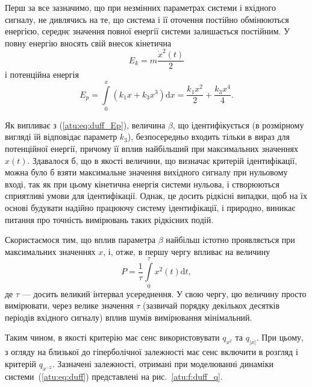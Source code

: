 Перш за все зазначимо, що при незмінних параметрах системи і
вхідного сигналу, не дивлячись на те, що система і її оточення
постійно обмінюються енергією, середнє значення повної енергії
системи залишається постійним. У повну енергію вносять свій
внесок кінетична
%
\begin{equation}
E_k = m \frac{\dot{x}^2(t)}{2}
\label{atu:eq:duff_Ek}
\end{equation}
%
і потенційна енергія
%
\begin{equation}
  E_p = \int\limits_0^x ( k_1 x + k_3 x^3 ) \mathrm{d}x =
\frac{k_1 x^2}{2} + \frac{k_3 x^4}{4}.
\label{atu:eq:duff_Ep}
\end{equation}

Як випливає з (\ref{atu:eq:duff_Ep}), величина $\beta$, що ідентифікується
(в розмірному вигляді їй відповідає параметр $k_3$), безпосередньо
входить тільки в вираз для потенційної енергії, причому її
вплив найбільший при максимальних значеннях $x(t)$.
Здавалося б, що в якості величини, що визначає критерій
ідентифікації, можна було б взяти максимальне значення
вихідного сигналу при нульовому вході, так як при цьому
кінетична енергія системи нульова, і створюються сприятливі
умови для ідентифікації. Однак, це досить рідкісні випадки, щоб
на їх основі будувати надійно працюючу систему ідентифікації,
і природно, виникає питання про точність вимірювань таких
рідкісних подій.

Скористаємося тим, що вплив параметра \(\beta\) найбільш істотно проявляється
при максимальних значеннях \(x\), і, отже, в першу чергу впливає
на величину
%
\begin{equation}
  P = \frac{1}{\tau}\int\limits_0^\tau x^2(t) \mathrm{d}t ,
\label{atu:eq:duff_P}
\end{equation}
%
де \(\tau \) --- досить великий інтервал усереднення. У свою чергу,
цю величину просто вимірювати, через велике значення \(\tau\)
(зазвичай порядку декількох десятків періодів вхідного сигналу)
вплив шумів вимірювання мінімальний.

Таким чином, в якості критерію має сенс використовувати
$q_{x^2}$ та
$q_{|x|}$. При цьому, з огляду на близької до гіперболічної
залежності має сенс включити в розгляд і критерій
$q_{x^{-2}} $. Зазначені залежності, отримані при моделюванні
динаміки системи~(\ref{atu:eq:duff}) представлені на рис.~\ref{atu:f:duff_q}.

